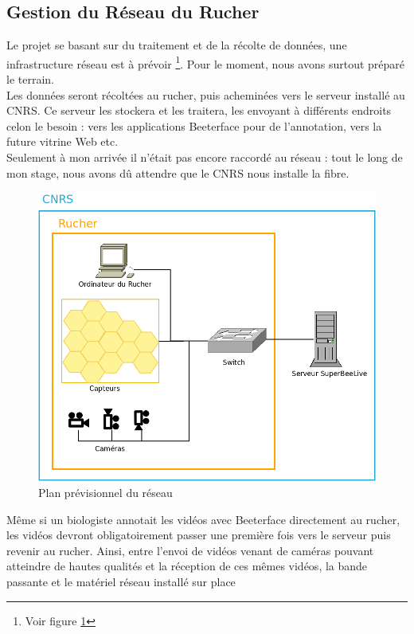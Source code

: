 \documentclass[11pt,french,a4paper]{report}
\begin{document}
        \subsection{Gestion du Réseau du Rucher}
Le projet se basant sur du traitement et de la récolte de données, une infrastructure réseau est à prévoir 
\footnote{Voir figure \ref{plan_res}}. Pour le moment, nous avons surtout préparé le terrain.  \\
Les données seront récoltées au rucher, puis acheminées vers le serveur installé au CNRS. Ce serveur les stockera et les traitera, 
les envoyant à différents endroits celon le besoin : vers les applications Beeterface pour de l'annotation, vers la future vitrine Web
etc. \\
Seulement à mon arrivée il n'était pas encore raccordé au réseau : tout le long de mon stage,  nous avons dû attendre que
le CNRS nous installe la fibre. \\
\begin{figure}[!h]
    \centering
    \includegraphics[scale=0.3]{../images/dia/plan_reseau.png}
    \caption{Plan prévisionnel du réseau}
    \label{plan_res}
\end{figure}
Même si un biologiste annotait les vidéos avec Beeterface directement au rucher, les vidéos devront obligatoirement passer une première 
fois vers le serveur puis revenir au rucher. Ainsi, entre l'envoi de vidéos venant de caméras pouvant atteindre de hautes
qualités et la réception de ces mêmes vidéos, la bande passante et le matériel réseau installé sur place 
\end{document}
